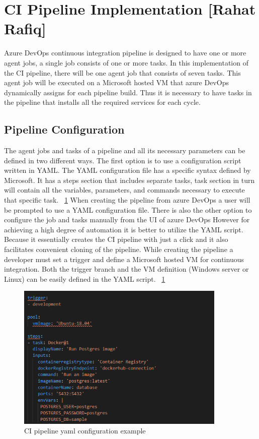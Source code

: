 \section{CI Pipeline Implementation [Rahat Rafiq]}\label{sec:ci_pipeline_implementaiton}

Azure DevOps continuous integration pipeline is designed to have one or more agent jobs, a single job consists of one or more tasks. In this implementation of the CI pipeline, there will be one agent job that consists of seven tasks. This agent job will be executed on a Microsoft hosted VM that azure DevOps dynamically assigns for each pipeline build. Thus it is necessary to have tasks in the pipeline that installs all the required services for each cycle.

\subsection{Pipeline Configuration}
The agent jobs and tasks of a pipeline and all its necessary parameters can be defined in two different ways. The first option is to use a configuration script written in YAML. The YAML configuration file has a specific syntax defined by Microsoft. It has a steps section that includes separate tasks, task section in turn will contain all the variables, parameters, and commands necessary to execute that specific task. ~\ref{fig:ci_pipeline_yaml_configuration_example} When creating the pipeline from azure DevOps a user will be prompted to use a YAML configuration file. There is also the other option to configure the job and tasks manually from the UI of azure DevOps However for achieving a high degree of automation it is better to utilize the YAML script. Because it essentially creates the CI pipeline with just a click and it also facilitates convenient cloning of the pipeline. While creating the pipeline a developer must set a trigger and define a Microsoft hosted VM for continuous integration. Both the trigger branch and the VM definition (Windows server or Linux) can be easily defined in the YAML script. ~\ref{fig:ci_pipeline_yaml_configuration_example}


\begin{figure}
    \centering
    \includegraphics[width=10cm]{images/Rahat/ci_yaml.PNG}
    \caption{CI pipeline yaml configuration example}
    \label{fig:ci_pipeline_yaml_configuration_example}
\end{figure}




